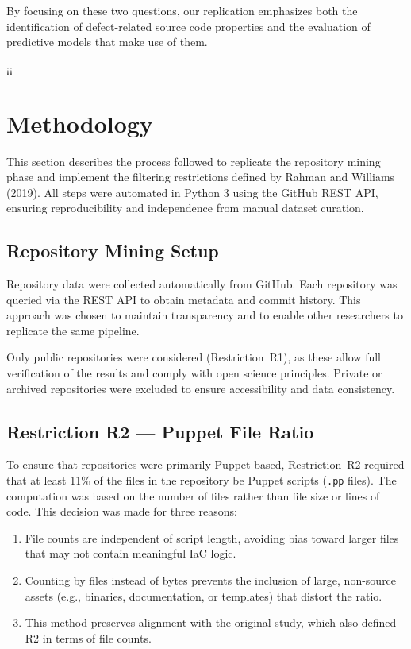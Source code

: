 \documentclass[conference]{IEEEtran}
\begin{document}
	By focusing on these two questions, our replication emphasizes both the identification of defect-related source code properties and the evaluation of predictive models that make use of them.
	
¡¡
	\section{Methodology}
	This section describes the process followed to replicate the repository mining phase and implement the filtering restrictions defined by Rahman and Williams (2019). All steps were automated in Python 3 using the GitHub REST API, ensuring reproducibility and independence from manual dataset curation.
	
	\subsection{Repository Mining Setup}
	Repository data were collected automatically from GitHub. Each repository was queried via the REST API to obtain metadata and commit history. This approach was chosen to maintain transparency and to enable other researchers to replicate the same pipeline. 
	
	Only public repositories were considered (Restriction~R1), as these allow full verification of the results and comply with open science principles. Private or archived repositories were excluded to ensure accessibility and data consistency.
	
	\subsection{Restriction R2 — Puppet File Ratio}
	To ensure that repositories were primarily Puppet-based, Restriction~R2 required that at least 11\% of the files in the repository be Puppet scripts (\texttt{.pp} files). The computation was based on the number of files rather than file size or lines of code. This decision was made for three reasons:
	
	\begin{enumerate}
		\item File counts are independent of script length, avoiding bias toward larger files that may not contain meaningful IaC logic.
		\item Counting by files instead of bytes prevents the inclusion of large, non-source assets (e.g., binaries, documentation, or templates) that distort the ratio.
		\item This method preserves alignment with the original study, which also defined R2 in terms of file counts.
	\end{enumerate}
	
\end{document}
